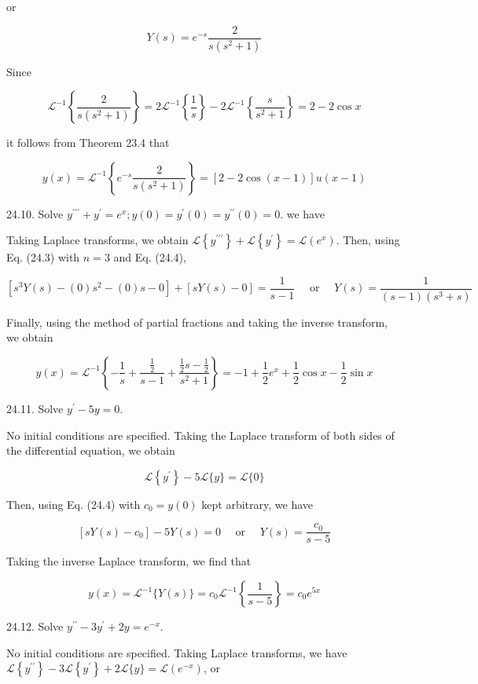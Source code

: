 \documentclass[10pt]{article}
\begin{document}
or

$$
Y(s)=e^{-s} \frac{2}{s\left(s^{2}+1\right)}
$$

Since

$$
\mathscr{L}^{-1}\left\{\frac{2}{s\left(s^{2}+1\right)}\right\}=2 \mathscr{L}^{-1}\left\{\frac{1}{s}\right\}-2 \mathscr{L}^{-1}\left\{\frac{s}{s^{2}+1}\right\}=2-2 \cos x
$$

it follows from Theorem 23.4 that

$$
y(x)=\mathscr{L}^{-1}\left\{e^{-s} \frac{2}{s\left(s^{2}+1\right)}\right\}=[2-2 \cos (x-1)] u(x-1)
$$

24.10. Solve $y^{\prime \prime \prime}+y^{\prime}=e^{x} ; y(0)=y^{\prime}(0)=y^{\prime \prime}(0)=0$. we have

Taking Laplace transforms, we obtain $\mathscr{L}\left\{y^{\prime \prime \prime}\right\}+\mathscr{L}\left\{y^{\prime}\right\}=\mathscr{L}\left(e^{x}\right)$. Then, using Eq. (24.3) with $n=3$ and Eq. (24.4),

$$
\left[s^{3} Y(s)-(0) s^{2}-(0) s-0\right]+[s Y(s)-0]=\frac{1}{s-1} \quad \text { or } \quad Y(s)=\frac{1}{(s-1)\left(s^{3}+s\right)}
$$

Finally, using the method of partial fractions and taking the inverse transform, we obtain

$$
y(x)=\mathscr{L}^{-1}\left\{-\frac{1}{s}+\frac{\frac{1}{2}}{s-1}+\frac{\frac{1}{2} s-\frac{1}{2}}{s^{2}+1}\right\}=-1+\frac{1}{2} e^{x}+\frac{1}{2} \cos x-\frac{1}{2} \sin x
$$

24.11. Solve $y^{\prime}-5 y=0$.

No initial conditions are specified. Taking the Laplace transform of both sides of the differential equation, we obtain

$$
\mathscr{L}\left\{y^{\prime}\right\}-5 \mathscr{L}\{y\}=\mathscr{L}\{0\}
$$

Then, using Eq. (24.4) with $c_{0}=y(0)$ kept arbitrary, we have

$$
\left[s Y(s)-c_{0}\right]-5 Y(s)=0 \quad \text { or } \quad Y(s)=\frac{c_{0}}{s-5}
$$

Taking the inverse Laplace transform, we find that

$$
y(x)=\mathscr{L}^{-1}\{Y(s)\}=c_{0} \mathscr{L}^{-1}\left\{\frac{1}{s-5}\right\}=c_{0} e^{5 x}
$$

24.12. Solve $y^{\prime \prime}-3 y^{\prime}+2 y=e^{-x}$.

No initial conditions are specified. Taking Laplace transforms, we have $\mathscr{L}\left\{y^{\prime \prime}\right\}-3 \mathscr{L}\left\{y^{\prime}\right\}+2 \mathscr{L}\{y\}=\mathscr{L}\left(e^{-x}\right)$, or
\end{document}
